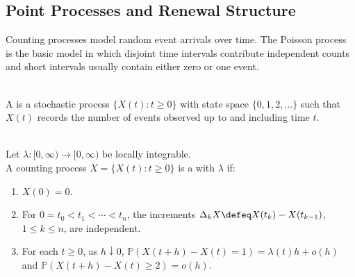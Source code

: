 \subsection{Point Processes and Renewal Structure}

Counting processes model random event arrivals over time. The Poisson process is the basic model in which disjoint time intervals contribute independent counts and short intervals usually contain either zero or one event.

\begin{definition} \label{def:counting-process} \\
A  is a stochastic process $\{X(t):t\geq0\}$ with state space $\{0,1,2,\ldots\}$ such that $X(t)$ records the number of events observed up to and including time $t$.
\end{definition}

\begin{definition} \label{def:poisson-process-intensity} \\
Let $\lambda:[0,\infty)\to[0,\infty)$ be locally integrable.\\
A counting process $X=\{X(t):t\geq0\}$ is a  with  $\lambda$ if:
\begin{enumerate}[label=(\roman*)]
\setlength{\itemsep}{0pt}
\item $X(0)=0$.
\item For $0=t_0<t_1<\cdots<t_n$, the increments $\Delta_kX\defeq X(t_k)-X(t_{k-1})$, $1\leq k\leq n$, are independent.
\item For each $t\geq0$, as $h\downarrow0$, $\mathbb{P}(X(t+h)-X(t)=1)=\lambda(t)h+o(h)$ and $\mathbb{P}(X(t+h)-X(t)\geq2)=o(h)$.
\end{enumerate}
\end{definition}

